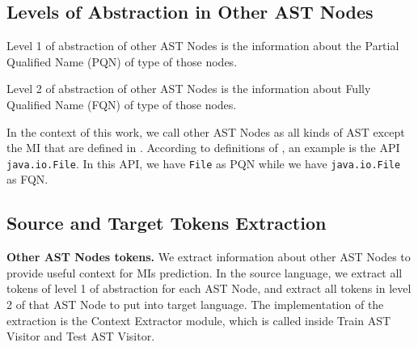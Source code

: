\subsection{Levels of Abstraction in Other AST Nodes}
\begin{definition}
Level 1 of abstraction of other AST Nodes is the information about the Partial Qualified Name (PQN) of type of those nodes.
\end{definition}
\begin{definition}
Level 2 of abstraction of other AST Nodes is the information about Fully Qualified Name (FQN) of type of those nodes.
\end{definition}
In the context of this work, we call other AST Nodes as all kinds of AST except the MI that are defined in \cite{id:ASTDocumentation}. According to definitions of \cite{8453132}, an example is the API \texttt{java.io.File}. In this API, we have \texttt{File} as PQN while we have \texttt{java.io.File} as FQN.

\subsection{Source and Target Tokens Extraction}
\textbf{Other AST Nodes tokens.} We extract information about other AST Nodes to provide useful context for MIs prediction. In the source language, we extract all tokens of level 1 of abstraction for each AST Node, and extract all tokens in level 2 of that AST Node to put into target language. The implementation of the extraction is the Context Extractor module, which is called inside Train AST Visitor and Test AST Visitor. 

